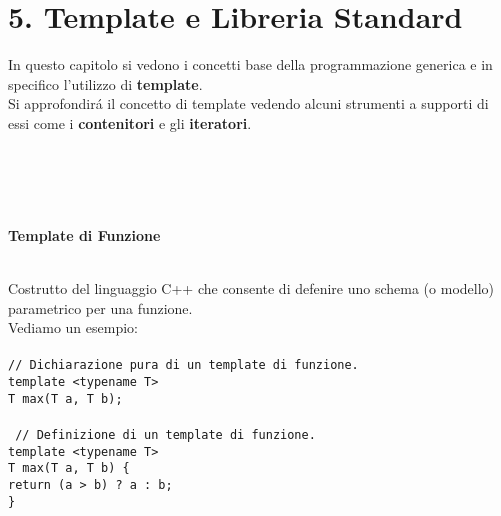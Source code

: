 \documentclass{article}
\newcommand\tab[1][1cm]{\hspace*{#1}}
\begin{document}
\section*{\textcolor{blu}{5. Template e Libreria Standard}}
In questo capitolo si vedono i concetti base della programmazione generica e in specifico l'utilizzo di \textbf{template}.\\Si approfondir\'a il concetto di template vedendo alcuni strumenti a supporti di essi come i \textbf{contenitori} e gli \textbf{iteratori}.
\\ \\ \\ \\ \\
\begin{large}\textcolor{blu}{\textbf{Template di Funzione}}\\ \\\end{large}
Costrutto del linguaggio C++ che consente di defenire uno schema (o modello) parametrico per una funzione.\\Vediamo un esempio:\\ \\
\texttt{\textcolor{grigio}{// Dichiarazione pura di un template di funzione.} \\ template <typename T> \\ T max(T a, T b); \\ \\ \textcolor{grigio}{ // Definizione di un template di funzione. } \\ template <typename T> \\ T max(T a, T b) \{ \\ \tab return (a > b) ? a : b; \\ \} } \\ 
\end{document}
